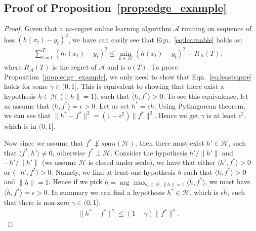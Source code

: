%


\subsection{Proof of Proposition~\ref{prop:edge_example}}
\begin{proof}
Given that a no-regret online learning algorithm $\mathcal{A}$ running on sequence of loss $(h(x_t) - y_t)^2$, we have can easily see that Eqn.~\ref{eq:learnable} holds as:
\begin{align}
\sum_{t=1}^T(h_t(x_t) - y_t)^2\leq \min_{h\in\mathcal{H}}(h(x_t) - y_t)^2 + R_{\mathcal{A}}(T), 
\end{align}where $R_{\mathcal{A}}(T)$ is the regret of $\mathcal{A}$ and is $o(T)$. To prove Proposition~\ref{prop:edge_example}, we only need to show that Eqn.~\ref{eq:leastsqure} holds for some $\gamma\in(0,1]$. This is equivalent to showing that there exist a hypothesis $\tilde{h}\in\mathcal{H}$ ($\|\tilde{h}\| = 1$), such that $\langle \tilde{h}, f^* \rangle > 0$. To see this equivalence, let us assume that $\langle \tilde{h}, f^* \rangle = \epsilon > 0$. Let us set $h^* = \epsilon \tilde{h}$. Using Pythagorean theorem, we can see that $\| h^* - f^* \|^2 = (1-\epsilon^2)\|f^*\|^2$. Hence we get $\gamma$ is at least $\epsilon^2$, which is in $(0,1]$. 


Now since we assume that $f^*\not\perp span(\mathcal{H})$, then there must exist ${h}'\in \mathcal{H}$, such that $\langle f^*, h'\rangle\neq 0$, otherwise $f^*\perp\mathcal{H}$. Consider the hypothesis $h'/\|h'\|$ and $-h'/\|h'\|$ (we assume $\mathcal{H}$ is closed under scale), we have that either $\langle h', f^*\rangle >0$ or $\langle -h', f^* \rangle >0$. Namely, we find at least one hypothesis $h$ such that $\langle h, f^*\rangle >0$ and $\|h\| = 1$.  Hence if we pick $\tilde{h} = \arg\max_{h\in\mathcal{H}, \|h\|=1} \langle h, f^* \rangle$, we must have $\langle  \tilde{h}, f^*\rangle = \epsilon >0$. In summary we can find a hypothesis $h^*\in\mathcal{H}$, which is $\epsilon\tilde{h}$, such that there is non-zero $\gamma\in(0,1]$:
\begin{align}
\|h^* - f^* \|^2\leq (1-\gamma)\|f^*\|^2.
\end{align}







\end{proof}
